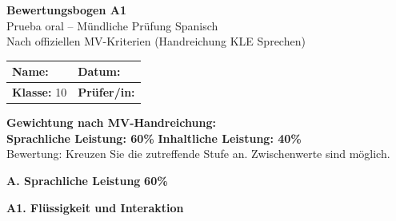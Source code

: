 \documentclass[11pt, a4paper]{article}
\begin{document}
\begin{center}
    {\LARGE\bfseries Bewertungsbogen A1}\\[4pt]
    {\large Prueba oral -- Mündliche Prüfung Spanisch}\\[6pt]
    {\small Nach offiziellen MV-Kriterien (Handreichung KLE Sprechen)}
\end{center}

\vspace{6pt}

\begin{tabularx}{\textwidth}{|X|X|}
\hline
\rowcolor{hellgrau}
\textbf{Name:} & \textbf{Datum:} \\[0.8em]
\hline
\textbf{Klasse:} \hfill 10 & \textbf{Prüfer/in:} \\[0.8em]
\hline
\end{tabularx}

\vspace{10pt}


\begin{tcolorbox}[colback=hellgrau, colframe=hellgrau, boxrule=0pt, arc=0pt,
    left=8pt, right=8pt, top=6pt, bottom=6pt,
    borderline west={3pt}{0pt}{spanischrot}]
\textbf{Gewichtung nach MV-Handreichung:}\\[2pt]
\textcolor{spracheblau}{\textbf{Sprachliche Leistung: 60\%}} \hfill
\textcolor{inhaltgruen}{\textbf{Inhaltliche Leistung: 40\%}}\\[4pt]
{\small Bewertung: Kreuzen Sie die zutreffende Stufe an. Zwischenwerte sind möglich.}
\end{tcolorbox}

\vspace{8pt}


{\large\textcolor{spracheblau}{\textbf{A. Sprachliche Leistung}} \hfill \textbf{60\%}}

\vspace{6pt}

\textbf{A1. Flüssigkeit und Interaktion}

\vspace{2pt}
\end{document}

